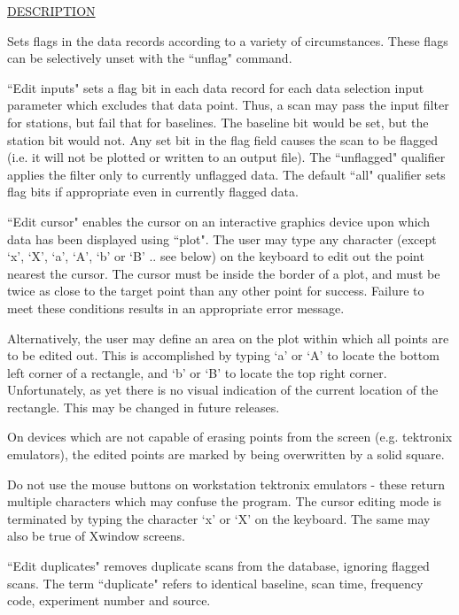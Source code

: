 \underline{DESCRIPTION}
\begin{list}{}{\setlength{\leftmargin}{0.5in}
     \setlength{\rightmargin}{0in}}
\item
Sets flags in the data records according to a variety of
circumstances.  These flags can be selectively unset with
the ``unflag" command.
\item
``Edit inputs" sets a flag bit in each data record for each
data selection input parameter which excludes that data point.
Thus, a scan may pass the input filter for stations, but fail
that for baselines.  The baseline bit would be set, but the
station bit would not.  Any set bit in the flag field causes
the scan to be flagged (i.e. it will not be plotted or written
to an output file).  The ``unflagged" qualifier applies the filter
only to currently unflagged data.  The default ``all" qualifier
sets flag bits if appropriate even in currently flagged data.
\item
``Edit cursor" enables the cursor on an interactive graphics device
upon which data has been displayed using ``plot".  The user may
type any character (except `x', `X', `a', `A', `b' or `B' ..  see 
below) on the keyboard to edit out the point nearest the cursor.
The cursor must be inside the border of a plot, and must be twice 
as close to the target point than any other point for success.  
Failure to meet these conditions results in an appropriate error 
message.    
\item
Alternatively, the user may define an area on the plot within which
all points are to be edited out.  This is accomplished by typing
`a' or `A' to locate the bottom left corner of a rectangle, and
`b' or `B' to locate the top right corner.  Unfortunately, as yet
there is no visual indication of the current location of the 
rectangle.  This may be changed in future releases.
\item
On devices which are not capable of erasing points from the screen
(e.g. tektronix emulators), the edited points are marked by being
overwritten by a solid square.
\item
Do not use the mouse buttons on workstation tektronix emulators - 
these return multiple characters which may confuse the program.
The cursor editing mode is terminated by typing the character `x' 
or `X' on the keyboard.  The same may also be true of Xwindow
screens.
\item
``Edit duplicates" removes duplicate scans from the database, 
ignoring flagged scans.  The term ``duplicate" refers to identical
baseline, scan time, frequency code, experiment number and source.

\end{list}
